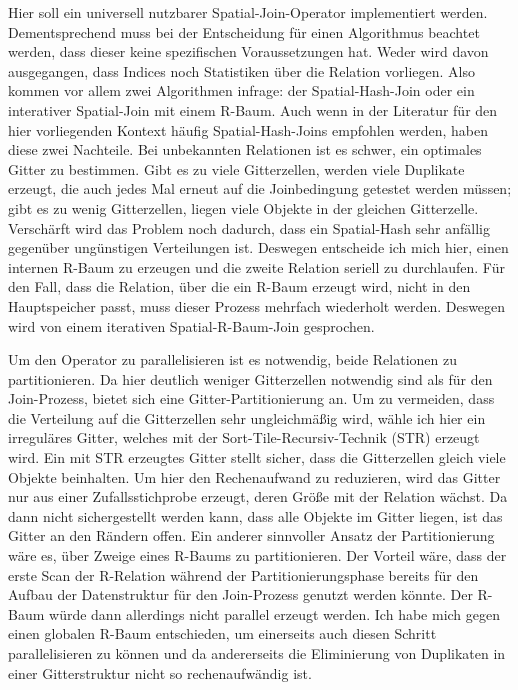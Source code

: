 \documentclass[a4paper,12pt,twoside]{article}
\begin{document}
{Hier soll ein universell nutzbarer Spatial-Join-Operator implementiert werden. Dementsprechend muss bei der Entscheidung für einen Algorithmus beachtet werden, dass dieser keine spezifischen Voraussetzungen hat. Weder wird davon ausgegangen, dass Indices noch Statistiken über die Relation vorliegen. Also kommen vor allem zwei Algorithmen infrage: der Spatial-Hash-Join oder ein interativer Spatial-Join mit einem R-Baum. Auch wenn in der Literatur für den hier vorliegenden Kontext häufig Spatial-Hash-Joins empfohlen werden, haben diese zwei Nachteile. Bei unbekannten Relationen ist es schwer, ein optimales Gitter zu bestimmen. Gibt es zu viele Gitterzellen, werden viele Duplikate erzeugt, die auch jedes Mal erneut auf die Joinbedingung getestet werden müssen;  gibt es zu wenig Gitterzellen, liegen viele Objekte in der gleichen Gitterzelle. Verschärft wird das Problem noch dadurch, dass ein Spatial-Hash sehr anfällig gegenüber ungünstigen Verteilungen ist. Deswegen entscheide ich mich hier, einen internen R-Baum zu erzeugen und die zweite Relation seriell zu durchlaufen. Für den Fall, dass die Relation, über die ein R-Baum erzeugt wird, nicht in den Hauptspeicher passt, muss dieser Prozess mehrfach wiederholt werden. Deswegen wird von einem iterativen Spatial-R-Baum-Join gesprochen.

Um den Operator zu parallelisieren ist es notwendig, beide Relationen zu partitionieren. Da hier deutlich weniger Gitterzellen notwendig sind als für den Join-Prozess, bietet sich eine Gitter-Partitionierung an. Um zu vermeiden, dass die Verteilung auf die Gitterzellen sehr ungleichmäßig wird, wähle ich hier ein irreguläres Gitter, welches mit der Sort-Tile-Recursiv-Technik (STR) erzeugt wird. Ein mit STR erzeugtes Gitter stellt sicher, dass die Gitterzellen gleich viele Objekte beinhalten. Um hier den Rechenaufwand zu reduzieren, wird das Gitter nur aus einer Zufallsstichprobe erzeugt, deren Größe mit der Relation wächst. Da dann nicht sichergestellt werden kann, dass alle Objekte im Gitter liegen, ist das Gitter an den Rändern offen. Ein anderer sinnvoller Ansatz der Partitionierung wäre es, über Zweige eines R-Baums zu partitionieren. Der Vorteil wäre, dass der erste Scan der R-Relation während der Partitionierungsphase bereits für den Aufbau der Datenstruktur für den Join-Prozess genutzt werden könnte. Der R-Baum würde dann allerdings nicht parallel erzeugt werden. Ich habe mich gegen einen globalen R-Baum entschieden, um einerseits auch diesen Schritt parallelisieren zu können und da andererseits die Eliminierung von Duplikaten in einer Gitterstruktur nicht so rechenaufwändig ist.

}
\end{document}
